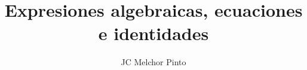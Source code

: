 \documentclass[12pt,addpoints,answers]{guia}
\title{Expresiones algebraicas, ecuaciones e identidades}
\author{JC Melchor Pinto}
\begin{document}
\pagestyle{headandfoot}
\INFO%
\begin{multicols}{2}
    
    \columnbreak
\end{multicols}%

\begin{questions}
    \questionboxed[10]{}
    \questionboxed[10]{}
    \questionboxed[10]{}
    \questionboxed[10]{}
    \questionboxed[10]{}
    \questionboxed[10]{}
    \questionboxed[10]{}
    \questionboxed[10]{}
    \questionboxed[10]{}
    \questionboxed[10]{}
\end{questions}
\end{document}

